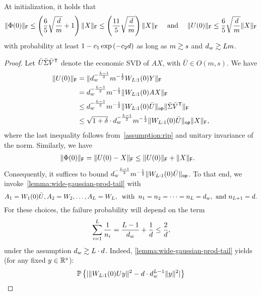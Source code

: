 \begin{lemma}
	\label{lemma:initial-regression-error}
	At initialization, it holds that
	\begin{align}
		\lVert\Phi(0)\rVert_{\mathsf{F}} \leq \left(\frac{6}{5}  \sqrt{\frac{d}{m}}  +1 \right) \lVert X\rVert_{\mathsf{F}} \leq
		\left(\frac{11}{5}  \sqrt{\frac{d}{m}}  \right) \lVert X\rVert_{\mathsf{F}}
		\quad \text{ and } \quad
		\lVert U(0)\rVert_{\mathsf{F}} \leq \frac{6}{5}  \sqrt{\frac{d}{m}}  \lVert X\rVert_{\mathsf{F}}
		\label{eq:initial-regression-error}
	\end{align}
	with probability at least $1 - c_1 \exp\left(-c_2 d\right)$ as long
	as $m \gtrsim s$ and $d_{w} \gtrsim L m$. 
\end{lemma}
\begin{proof}
	Let $\bar{U} \bar{\Sigma} \bar{V}^{\mathsf{T}}$ denote the economic SVD of $AX$, with $\bar{U} \in O(m, s)$. We have
	\begin{align*}
		\lVert U(0)\rVert_{\mathsf{F}}
		 & = \lVert d_w^{-\frac{L-1}{2}}m^{-\frac{1}{2}} W_{L:1}(0)Y\rVert_{\mathsf{F}} \\
    &= d_w^{-\frac{L-1}{2}}m^{-\frac{1}{2}} \lVert W_{L:1}(0)AX\rVert_{\mathsf{F}} \\
    &\leq d_{w}^{-\frac{L-1}{2}} m^{-\frac{1}{2}}
    \lVert W_{L:1}(0)\bar{U}\rVert_{\mathsf{op}}
    \lVert\bar{\Sigma} \bar{V}^{\mathsf{T}}\rVert_{\mathsf{F}} \\
    &\leq \sqrt{1 + \delta} \cdot d_{w}^{-\frac{L-1}{2}} m^{-\frac{1}{2}}
    \lVert W_{L:1}(0)\bar{U}\rVert_{\mathsf{op}}
    \lVert X\rVert_{\mathsf{F}},
	\end{align*}
	where the last inequality follows from~\cref{assumption:rip} and unitary invariance
    of the norm. Similarly, we have
	\begin{align*}
		\lVert\Phi(0)\rVert_{\mathsf{F}}
		 & = \lVert U(0) - X\rVert_{\mathsf{F}}
		\leq \lVert U(0)\rVert_{\mathsf{F}} + \lVert X\rVert_{\mathsf{F}}.
	\end{align*}
	Consequently, it suffices to bound
	$d_w^{-\frac{L-1}{2}}m^{-\frac{1}{2}}\lVert W_{L:1}(0)\bar{U}\rVert_{\mathsf{op}}$. To that end,
    we invoke~\cref{lemma:wide-gaussian-prod-tail} with
    \[
        A_{1} = W_{1}(0) \bar{U}, A_{2} = W_2, \dots, A_{L} = W_{L}, \;\; \text{with} \;\;
        n_{1} = n_{2} = \dots = n_{L} = d_{w}, \text{ and } n_{L+1} = d.
    \]
    For these choices, the failure probability will depend on the term
    \[
        \sum_{i = 1}^L \frac{1}{n_i}
        = \frac{L-1}{d_{w}} + \frac{1}{d} 
        \leq \frac{2}{d},
    \]
    under the assumption $d_{w} \gtrsim L \cdot d$. Indeed,
    \cref{lemma:wide-gaussian-prod-tail} yields (for any fixed $y \in \mathbb{R}^s$):
    \begin{equation}
        \mathbb{P}\left\{ {\lvert\lVert W_{L:1}(0)Uy\rVert^2 - d \cdot d_{w}^{L - 1} \lVert y\rVert^2\rvert
} \right\}
\end{equation}
\end{proof}
